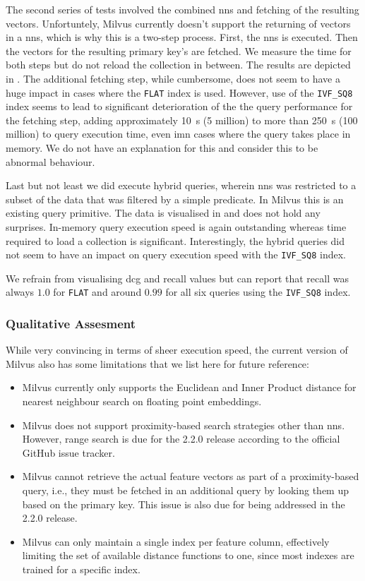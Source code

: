 The second series of tests involved the combined \acrshort{nns} and fetching of the resulting vectors. Unfortuntely, Milvus currently doesn't support the returning of vectors in a \acrshort{nns}, which is why this is a two-step process. First, the \acrshort{nns} is executed. Then the vectors for the resulting primary key's are fetched. We measure the time for both steps but do not reload the collection in between. The results are depicted in . The additional fetching step, while cumbersome, does not seem to have a huge impact in cases where the \texttt{FLAT} index is used. However, use of the \texttt{IVF\_SQ8} index seems to lead to significant deterioration of the the query performance for the fetching step, adding approximately \SI{10}{\second} (5 million) to more than \SI{250}{\second} (100 million) to query execution time, even imn cases where the query takes place in memory. We do not have an explanation for this and consider this to be abnormal behaviour.

Last but not least we did execute hybrid queries, wherein \acrshort{nns} was restricted to a subset of the data that was filtered by a simple predicate. In Milvus this is an existing query primitive. The data is visualised in  and does not hold any surprises. In-memory query execution speed is again outstanding whereas time required to load a collection is significant. Interestingly, the hybrid queries did not seem to have an impact on query execution speed with the \texttt{IVF\_SQ8} index.

We refrain from visualising \acrshort{dcg} and recall values but can report that recall was always $1.0$ for \texttt{FLAT} and around $0.99$ for all six queries using the \texttt{IVF\_SQ8} index.

\subsubsection{Qualitative Assesment}
While very convincing in terms of sheer execution speed, the current version of Milvus also has some limitations that we list here for future reference:

\begin{itemize}
    \item Milvus currently only supports the Euclidean and Inner Product distance for nearest neighbour search on floating point embeddings.
    \item Milvus does not support proximity-based search strategies other than \acrshort{nns}. However, range search is due for the 2.2.0 release according to the official GitHub issue tracker.
    \item Milvus cannot retrieve the actual feature vectors as part of a proximity-based query, i.e., they must be fetched in an additional query by looking them up based on the primary key. This issue is also due for being addressed in the 2.2.0 release.
    \item Milvus can only maintain a single index per feature column, effectively limiting the set of available distance functions to one, since most indexes are trained for a specific index.
\end{itemize}

